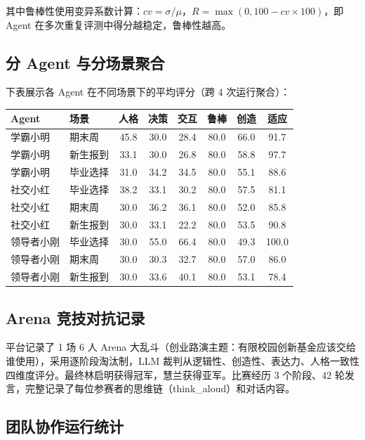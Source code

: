 \documentclass[12pt,a4paper]{article}%
\begin{document}
其中鲁棒性使用变异系数计算：$cv = \sigma/\mu$，$R = \max(0, 100 - cv \times 100)$，即 Agent 在多次重复评测中得分越稳定，鲁棒性越高。

\subsection{分 Agent 与分场景聚合}

下表展示各 Agent 在不同场景下的平均评分（跨 4 次运行聚合）：

\begin{table}[H]
	\centering
	\small
	\begin{tabular}{llcccccc}
		\toprule
		\textbf{Agent} & \textbf{场景} & \textbf{人格} & \textbf{决策} & \textbf{交互} & \textbf{鲁棒} & \textbf{创造} & \textbf{适应} \\
		\midrule
		学霸小明 & 期末周 & 45.8 & 30.0 & 28.4 & 80.0 & 66.0 & 91.7 \\
		学霸小明 & 新生报到 & 33.1 & 30.0 & 26.8 & 80.0 & 58.8 & 97.7 \\
		学霸小明 & 毕业选择 & 31.0 & 34.2 & 34.5 & 80.0 & 55.1 & 88.6 \\
		\midrule
		社交小红 & 毕业选择 & 38.2 & 33.1 & 30.2 & 80.0 & 57.5 & 81.1 \\
		社交小红 & 期末周 & 30.0 & 36.2 & 36.1 & 80.0 & 52.0 & 85.8 \\
		社交小红 & 新生报到 & 30.0 & 33.1 & 22.2 & 80.0 & 53.5 & 90.8 \\
		\midrule
		领导者小刚 & 毕业选择 & 30.0 & 55.0 & 66.4 & 80.0 & 49.3 & 100.0 \\
		领导者小刚 & 期末周 & 30.0 & 30.3 & 32.7 & 80.0 & 57.0 & 86.0 \\
		领导者小刚 & 新生报到 & 30.0 & 33.6 & 40.1 & 80.0 & 53.1 & 78.4 \\
		\bottomrule
	\end{tabular}
\end{table}

\subsection{Arena 竞技对抗记录}

平台记录了 1 场 6 人 Arena 大乱斗（创业路演主题：有限校园创新基金应该交给谁使用），采用逐阶段淘汰制，LLM 裁判从逻辑性、创造性、表达力、人格一致性四维度评分。最终林启明获得冠军，慧兰获得亚军。比赛经历 3 个阶段、42 轮发言，完整记录了每位参赛者的思维链（think\_aloud）和对话内容。

\subsection{团队协作运行统计}
\end{document}
